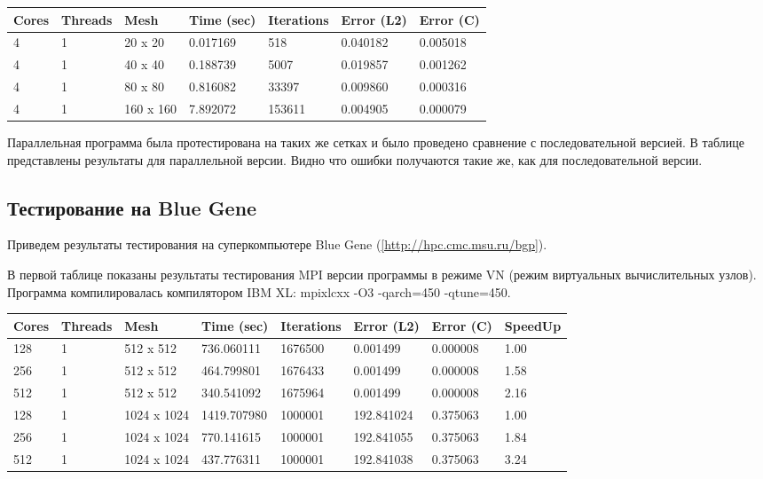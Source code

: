 \documentclass[12pt]{article}
\begin{document}
\begin{center}
\begin{tabular}{lllllll}
Cores & Threads & Mesh & Time (sec) & Iterations & Error (L2) & Error (C) \\
\hline
4 & 1 & 20 x 20 & 0.017169 & 518 & 0.040182 & 0.005018 \\
4 & 1 & 40 x 40 & 0.188739 & 5007 & 0.019857 & 0.001262 \\
4 & 1 & 80 x 80 & 0.816082 & 33397 & 0.009860 & 0.000316 \\
4 & 1 & 160 x 160 & 7.892072 & 153611 & 0.004905 & 0.000079 \\
\hline
\end{tabular}
\end{center}
Параллельная программа была протестирована на таких же сетках и было проведено сравнение
с последовательной версией. В таблице представлены результаты для параллельной версии.
Видно что ошибки получаются такие же, как для последовательной версии.

\newpage

\subsection{Тестирование на Blue Gene}

Приведем результаты тестирования на суперкомпьютере Blue Gene (\ref{http://hpc.cmc.msu.ru/bgp}). 

В первой таблице показаны результаты тестирования MPI версии программы в режиме VN (режим виртуальных вычислительных узлов).
Программа компилировалась компилятором IBM XL: mpixlcxx -O3 -qarch=450 -qtune=450.
\begin{center}
\begin{tabular}{llllllll}
Cores & Threads & Mesh & Time (sec) & Iterations & Error (L2) & Error (C) & SpeedUp \\
\hline
128 & 1 & 512 x 512 & 736.060111 & 1676500 & 0.001499 & 0.000008 & 1.00 \\	
256 & 1 & 512 x 512 & 464.799801 & 1676433 & 0.001499 & 0.000008 & 1.58 \\
512 & 1 & 512 x 512 & 340.541092 & 1675964 & 0.001499 & 0.000008 & 2.16 \\
\hline
128 & 1 & 1024 x 1024 & 1419.707980 & 1000001 & 192.841024 & 0.375063 & 1.00 \\
256 & 1 & 1024 x 1024 & 770.141615 & 1000001 & 192.841055 & 0.375063  & 1.84 \\
512 & 1 & 1024 x 1024 & 437.776311 & 1000001 & 192.841038 & 0.375063  & 3.24 \\
\hline
\end{tabular}
\end{center}
\end{document}
